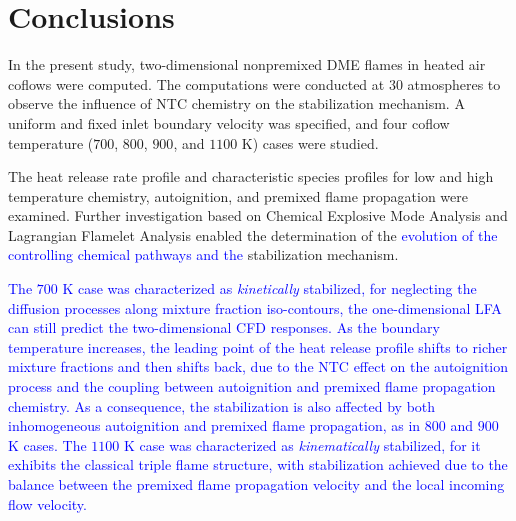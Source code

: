 \documentclass[review,3p,times]{elsarticle}
\begin{document}
\section{Conclusions}

In the present study, two-dimensional nonpremixed DME flames in heated air coflows were computed.  The computations were conducted at $30$ atmospheres to observe the influence of NTC chemistry on the stabilization mechanism.  A uniform and fixed inlet boundary velocity was specified, and four coflow temperature ($700$, $800$, $900$, and $1100$ K) cases were studied.  

The heat release rate profile and characteristic species profiles for low and high temperature chemistry, autoignition, and premixed flame propagation were examined.  Further investigation based on Chemical Explosive Mode Analysis and Lagrangian Flamelet Analysis enabled the determination of the \textcolor{blue}{evolution of the controlling chemical pathways and the }stabilization mechanism.  

\textcolor{blue}{The $700$ K case was characterized as \emph {kinetically} stabilized, for neglecting the diffusion processes along mixture fraction iso-contours, the one-dimensional LFA can still predict the two-dimensional CFD responses.  As the boundary temperature increases, the leading point of the heat release profile shifts to richer mixture fractions and then shifts back, due to the NTC effect on the autoignition process and the coupling between autoignition and premixed flame propagation chemistry.  As a consequence, the stabilization is also affected by both inhomogeneous autoignition and premixed flame propagation, as in $800$ and $900$ K cases.  The $1100$ K case was characterized as \emph {kinematically} stabilized, for it exhibits the classical triple flame structure, with stabilization achieved due to the balance between the premixed flame propagation velocity and the local incoming flow velocity.}


\end{document}
